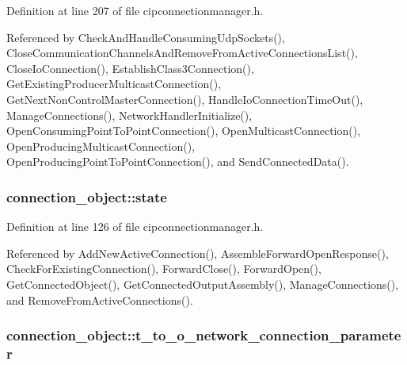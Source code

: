 \-Definition at line 207 of file cipconnectionmanager.\-h.



\-Referenced by \-Check\-And\-Handle\-Consuming\-Udp\-Sockets(), \-Close\-Communication\-Channels\-And\-Remove\-From\-Active\-Connections\-List(), \-Close\-Io\-Connection(), \-Establish\-Class3\-Connection(), \-Get\-Existing\-Producer\-Multicast\-Connection(), \-Get\-Next\-Non\-Control\-Master\-Connection(), \-Handle\-Io\-Connection\-Time\-Out(), \-Manage\-Connections(), \-Network\-Handler\-Initialize(), \-Open\-Consuming\-Point\-To\-Point\-Connection(), \-Open\-Multicast\-Connection(), \-Open\-Producing\-Multicast\-Connection(), \-Open\-Producing\-Point\-To\-Point\-Connection(), and \-Send\-Connected\-Data().

\hypertarget{structconnection__object_a07b0290442443753728fe18cc6a756a4}{
\subsubsection[{state}]{ {\bf connection\-\_\-object\-::state}}}\label{d1/d48/structconnection__object_a07b0290442443753728fe18cc6a756a4}


\-Definition at line 126 of file cipconnectionmanager.\-h.



\-Referenced by \-Add\-New\-Active\-Connection(), \-Assemble\-Forward\-Open\-Response(), \-Check\-For\-Existing\-Connection(), \-Forward\-Close(), \-Forward\-Open(), \-Get\-Connected\-Object(), \-Get\-Connected\-Output\-Assembly(), \-Manage\-Connections(), and \-Remove\-From\-Active\-Connections().

\hypertarget{structconnection__object_a8ccf723e8dce62eb578a046fd35a774f}{
\subsubsection[{t\-\_\-to\-\_\-o\-\_\-network\-\_\-connection\-\_\-parameter}]{ {\bf connection\-\_\-object\-::t\-\_\-to\-\_\-o\-\_\-network\-\_\-connection\-\_\-parameter}}}\label{d1/d48/structconnection__object_a8ccf723e8dce62eb578a046fd35a774f}


